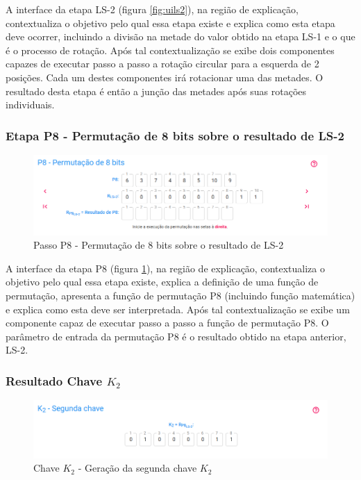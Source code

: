 A interface da etapa LS-2 (figura \ref{fig:uils2}), na região de explicação, contextualiza o objetivo pelo qual essa etapa existe e explica como esta etapa deve ocorrer, incluindo a divisão na metade do valor obtido na etapa LS-1 e o que é o processo de rotação. Após tal contextualização se exibe dois componentes capazes de executar passo a passo a rotação circular para a esquerda de 2 posições. Cada um destes componentes irá rotacionar uma das metades. O resultado desta etapa é então a junção das metades após suas rotações individuais.

\subsubsection{Etapa P8 - Permutação de 8 bits sobre o resultado de LS-2}

\begin{figure}[H]
    \centering
    \caption{Passo P8 - Permutação de 8 bits sobre o resultado de LS-2}
    \label{fig:uip82}
    \includegraphics[width=1\linewidth]{UI/UIP82.png}
\end{figure}

A interface da etapa P8 (figura \ref{fig:uip82}), na região de explicação, contextualiza o objetivo pelo qual essa etapa existe, explica a definição de uma função de permutação, apresenta a função de permutação P8 (incluindo função matemática) e explica como esta deve ser interpretada. Após tal contextualização se exibe um componente capaz de executar passo a passo a função de permutação P8. O parâmetro de entrada da permutação P8 é o resultado obtido na etapa anterior, LS-2.

\subsubsection{Resultado Chave \(K_2\)}

\begin{figure}[H]
    \centering
    \caption{Chave \(K_2\) - Geração da segunda chave \(K_2\)}
    \label{fig:uik2}
    \includegraphics[width=1\linewidth]{UI/UIK2.png}
\end{figure}

